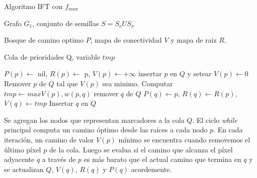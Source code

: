 \documentclass[a4paper,10pt]{article}
\begin{document}
\begin{algorithm}
    \caption{Algoritmo IFT con $f_{max}$}
    \label{fig:IFTrace-IFT-algorithm}
    \begin{algorithmic}
        \Require\hspace{\algorithmicindent}\hspace{\algorithmicindent}Grafo $G_{1}$, conjunto de semillas $S = S_{o} U S_{x}$

        \Ensure \hspace{\algorithmicindent}\hspace{0.23cm} Bosque de camino optimo $P$, mapa de conectividad $V$
        \State\hspace{\algorithmicindent}\hspace{\algorithmicindent}\hspace{\algorithmicindent}\hspace{0.3cm} y mapa de raiz $R$.

        \Auxiliary\hspace{\algorithmicindent} Cola de prioridades Q, variable $tmp$

        \State

            \State $P(p) \gets$ nil, $R(p) \gets$ p, $V(p) \gets + \infty$
             insertar $p$ en $Q$ y setear $V(p) \gets 0$ \EndIf
        \EndFor
            \State Remover $p$ de $Q$ tal que $V(p)$ sea minimo.
                \State Computar $tmp \gets max{V(p), w(p,q)}$
                     remover $q$ de $Q$ \EndIf
                    \State $P(q) \gets p$, $R(q) \gets R(p)$, $V(q) \gets tmp$
                    \State Insertar $q$ en $Q$
                \EndIf
            \EndFor
        \EndWhile
    \end{algorithmic}
\end{algorithm}



Se agregan
los nodos que representan marcadores a la cola $Q$. El ciclo \textit{while}
principal computa un camino óptimo desde las raíces a cada nodo $p$. En
cada iteración, un camino de valor $V(p)$ mínimo se encuentra cuando
removemos el último píxel $p$ de la cola. Luego se evalua si el camino que
alcanza el píxel adyacente $q$ a través de $p$ es más barato que el actual
camino que termina en $q$ y se actualizan $Q$, $V(q)$, $R(q)$ y $P(q)$
acordemente.
\end{document}

